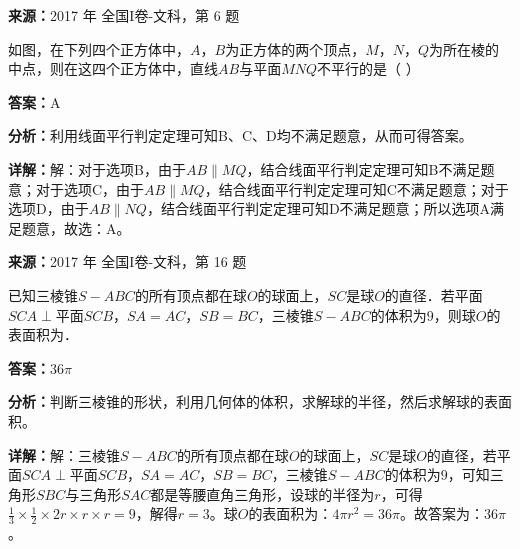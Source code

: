 \begin{question}[points=5]
\textbf{来源：}2017 年 全国I卷-文科，第 6 题\par
如图，在下列四个正方体中，$A$，$B$为正方体的两个顶点，$M$，$N$，$Q$为所在棱的中点，则在这四个正方体中，直线$AB$与平面$MNQ$不平行的是（     ）
\begin{choices}
  \item 
  \item 
  \item 
  \item 
\end{choices}
\begin{solution}
\textbf{答案：}A

\textbf{分析：}利用线面平行判定定理可知B、C、D均不满足题意，从而可得答案。

\textbf{详解：}解：对于选项B，由于$AB\parallel MQ$，结合线面平行判定定理可知B不满足题意；对于选项C，由于$AB\parallel MQ$，结合线面平行判定定理可知C不满足题意；对于选项D，由于$AB\parallel NQ$，结合线面平行判定定理可知D不满足题意；所以选项A满足题意，故选：A。
\end{solution}
\end{question}

\begin{question}[points=5]
\textbf{来源：}2017 年 全国I卷-文科，第 16 题\par
已知三棱锥$S-ABC$的所有顶点都在球$O$的球面上，$SC$是球$O$的直径．若平面$SCA\perp$平面$SCB$，$SA=AC$，$SB=BC$，三棱锥$S-ABC$的体积为$9$，则球$O$的表面积为．
\fillin[{$36\pi$}]
\begin{solution}
\textbf{答案：}$36\pi$

\textbf{分析：}判断三棱锥的形状，利用几何体的体积，求解球的半径，然后求解球的表面积。

\textbf{详解：}解：三棱锥$S-ABC$的所有顶点都在球$O$的球面上，$SC$是球$O$的直径，若平面$SCA\perp$平面$SCB$，$SA=AC$，$SB=BC$，三棱锥$S-ABC$的体积为$9$，可知三角形$SBC$与三角形$SAC$都是等腰直角三角形，设球的半径为$r$，可得$\frac{1}{3}\times\frac{1}{2}\times2r\times r\times r=9$，解得$r=3$。球$O$的表面积为：$4\pi r^2=36\pi$。故答案为：$36\pi$。
\end{solution}
\end{question}

